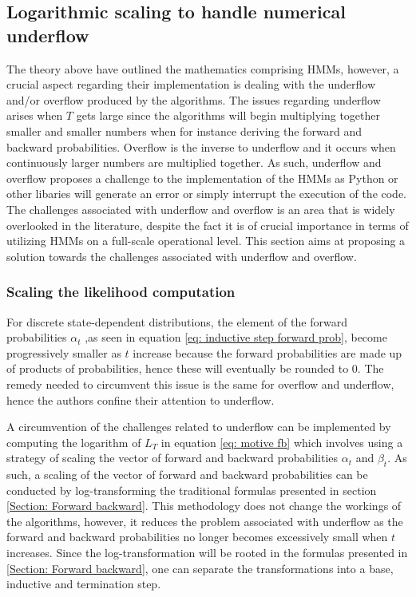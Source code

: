 \subsection{Logarithmic scaling to handle numerical underflow}
The theory above have outlined the mathematics comprising HMMs, however, a crucial aspect regarding their implementation is dealing with the underflow and/or overflow produced by the algorithms. The issues regarding underflow arises when $T$ gets large since the algorithms will begin multiplying together smaller and smaller numbers when for instance deriving the forward and backward probabilities. Overflow is the inverse to underflow and it occurs when continuously larger numbers are multiplied together. As such, underflow and overflow proposes a challenge to the implementation of the HMMs as Python or other libaries will generate an error or simply interrupt the execution of the code. The challenges associated with underflow and overflow is an area that is widely overlooked in the literature, despite the fact it is of crucial importance in terms of utilizing HMMs on a full-scale operational level. This section aims at proposing a solution towards the challenges associated with underflow and overflow.

\subsubsection{Scaling the likelihood computation}
For discrete state-dependent distributions, the element of the forward probabilities $\alpha_t$ ,as seen in equation \ref{eq: inductive step forward prob}, become progressively smaller as $t$ increase because the forward probabilities are made up of products of probabilities, hence these will eventually be rounded to 0. The remedy needed to circumvent this issue is the same for overflow and underflow, hence the authors confine their attention to underflow.

A circumvention of the challenges related to underflow can be implemented by computing the logarithm of $L_T$ in equation \ref{eq: motive fb} which involves using a strategy of scaling the vector of forward and backward probabilities $\alpha_t$ and $\beta_t$. As such, a scaling of the vector of forward and backward probabilities can be conducted by log-transforming the  traditional formulas presented in section \ref{Section: Forward backward}. This methodology does not change the workings of the algorithms, however, it reduces the problem associated with underflow as the forward and backward probabilities no longer becomes excessively small when $t$ increases. Since the log-transformation will be rooted in the formulas presented in \ref{Section: Forward backward}, one can separate the transformations into a base, inductive and termination step.  

